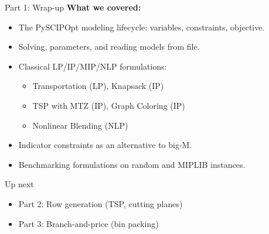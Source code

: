 \documentclass[aspectratio=169,10pt]{beamer}
\begin{document}
\begin{frame}{Part 1: Wrap-up}
\textbf{What we covered:}
\begin{itemize}
  \item The PySCIPOpt modeling lifecycle: variables, constraints, objective.
  \item Solving, parameters, and reading models from file.
  \item Classical LP/IP/MIP/NLP formulations:
    \begin{itemize}
      \item Transportation (LP), Knapsack (IP)
      \item TSP with MTZ (IP), Graph Coloring (IP)
      \item Nonlinear Blending (NLP)
    \end{itemize}
  \item Indicator constraints as an alternative to big-M.
  \item Benchmarking formulations on random and MIPLIB instances.
\end{itemize}

\medskip
\begin{block}{Up next}
\begin{itemize}
  \item Part 2: Row generation (TSP, cutting planes)
  \item Part 3: Branch-and-price (bin packing)
\end{itemize}
\end{block}
\end{frame}
\end{document}
